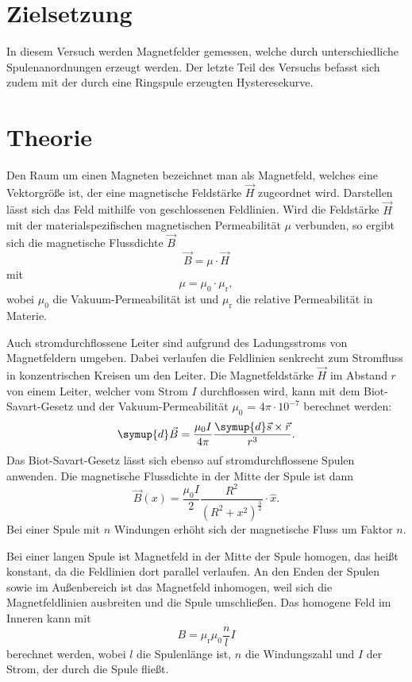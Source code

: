 \section{Zielsetzung}
In diesem Versuch werden Magnetfelder gemessen, welche durch unterschiedliche Spulenanordnungen erzeugt werden.
Der letzte Teil des Versuchs befasst sich zudem mit der durch eine Ringspule erzeugten Hysteresekurve.

\section{Theorie}
Den Raum um einen Magneten bezeichnet man als Magnetfeld, welches eine Vektorgröße ist, der eine magnetische Feldstärke $\vec{H}$ zugeordnet wird. Darstellen lässt sich
das Feld mithilfe von geschlossenen Feldlinien. 
Wird die Feldstärke $\vec{H}$ mit der materialspezifischen magnetischen Permeabilität $\mu$ verbunden, so ergibt sich die magnetische Flussdichte $\vec{B}$
\begin{equation}
\label{eqn:bmuh}
\vec{B} = \mu \cdot \vec{H}
\end{equation}
mit
\begin{equation*}
\mu = \mu_0 \cdot \mu_{\text{r}},
\end{equation*}
wobei $\mu_0$ die Vakuum-Permeabilität ist und $\mu_{\text{r}}$ die relative Permeabilität in Materie.

Auch stromdurchflossene Leiter sind aufgrund des Ladungsstroms von Magnetfeldern umgeben. Dabei verlaufen die Feldlinien senkrecht zum Stromfluss in konzentrischen 
Kreisen um den Leiter. Die Magnetfeldstärke $\vec{H}$ im Abstand $r$ von einem Leiter, welcher vom Strom $I$ durchflossen wird, kann mit dem Biot-Savart-Gesetz und der 
Vakuum-Permeabilität $\mu_0$ = $4\pi \cdot 10^{-7}$ berechnet 
werden:
\begin{equation*}
\symup{d}\vec{B} = \frac{\mu_0 I}{4 \pi} \frac{\symup{d}\vec{s} \times \vec{r}}{r^3}.
\end{equation*}
Das Biot-Savart-Gesetz lässt sich ebenso auf stromdurchflossene Spulen anwenden. Die magnetische Flussdichte in der Mitte der Spule ist dann
\begin{equation*}
\vec{B}(x) = \frac{\mu_0 I}{2} \frac{R^2}{(R^2 + x^2)^{\frac{3}{2}}} \cdot \hat{x}.
\end{equation*}
Bei einer Spule mit $n$ Windungen erhöht sich der magnetische Fluss um Faktor $n$.

Bei einer langen Spule ist Magnetfeld in der Mitte der Spule homogen, das heißt konstant, da die Feldlinien dort parallel verlaufen. An den Enden der Spulen sowie 
im Außenbereich ist das Magnetfeld inhomogen, weil sich die Magnetfeldlinien ausbreiten und die Spule umschließen. Das homogene Feld im Inneren kann mit 
\begin{equation}
\label{eqn:formel1}
B = \mu_{\text{r}}\mu_0 \frac{n}{l}I
\end{equation}
berechnet werden, wobei $l$ die Spulenlänge ist, $n$ die Windungszahl und $I$ der Strom, der durch die Spule fließt.

